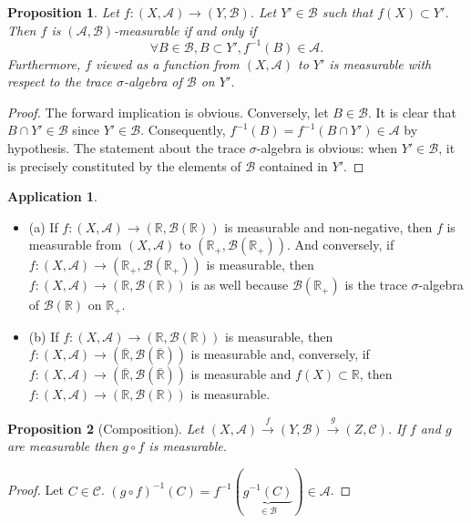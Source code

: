 \documentclass[12pt]{article}
\newtheorem{proposition}{Proposition}[section]
\theoremstyle{definition}
\newtheorem{application}{Application}[section]
\begin{document}
\begin{proposition}
Let $f : (X, \mathscr{A}) \to (Y, \mathscr{B})$. Let $Y' \in \mathscr{B}$ such that $f(X) \subset Y'$. Then $f$ is $(\mathscr{A}, \mathscr{B})$-measurable if and only if
$$ \forall B \in \mathscr{B}, B \subset Y', f^{-1}(B) \in \mathscr{A}. $$
Furthermore, $f$ viewed as a function from $(X, \mathscr{A})$ to $Y'$ is measurable with respect to the trace $\sigma$-algebra of $\mathscr{B}$ on $Y'$.
\end{proposition}
\begin{proof}
    The forward implication is obvious.
    Conversely, let $B \in \mathscr{B}$. It is clear that $B \cap Y' \in \mathscr{B}$ since $Y' \in \mathscr{B}$. Consequently, $f^{-1}(B) = f^{-1}(B \cap Y') \in \mathscr{A}$ by hypothesis. The statement about the trace $\sigma$-algebra is obvious: when $Y' \in \mathscr{B}$, it is precisely constituted by the elements of $\mathscr{B}$ contained in $Y'$. 
\end{proof}

\begin{application}
    \begin{itemize}
    \item (a) If $f : (X, \mathscr{A}) \to (\mathbb{R}, \mathscr{B}(\mathbb{R}))$ is measurable and non-negative, then $f$ is measurable from $(X, \mathscr{A})$ to $(\mathbb{R}_+, \mathscr{B}(\mathbb{R}_+))$. And conversely, if $f : (X, \mathscr{A}) \to (\mathbb{R}_+, \mathscr{B}(\mathbb{R}_+))$ is measurable, then $f : (X, \mathscr{A}) \to (\mathbb{R}, \mathscr{B}(\mathbb{R}))$ is as well because $\mathscr{B}(\mathbb{R}_+)$ is the trace $\sigma$-algebra of $\mathscr{B}(\mathbb{R})$ on $\mathbb{R}_+$.

\item (b) If $f : (X, \mathscr{A}) \to (\mathbb{R}, \mathscr{B}(\mathbb{R}))$ is measurable, then $f : (X, \mathscr{A}) \to (\overline{\mathbb{R}}, \mathscr{B}(\overline{\mathbb{R}}))$ is measurable and, conversely, if $f : (X, \mathscr{A}) \to (\overline{\mathbb{R}}, \mathscr{B}(\overline{\mathbb{R}}))$ is measurable and $f(X) \subset \mathbb{R}$, then $f : (X, \mathscr{A}) \to (\mathbb{R}, \mathscr{B}(\mathbb{R}))$ is measurable.
\end{itemize}
\end{application}

\begin{proposition}[Composition]
    Let $(X, \mathscr{A}) \xrightarrow{f} (Y, \mathscr{B}) \xrightarrow{g} (Z, \mathscr{C})$. If $f$ and $g$ are measurable then $g \circ f$ is measurable.
\end{proposition}
\begin{proof}
	Let $C \in \mathscr{C}$. $(g \circ f)^{-1}(C) = f^{-1}(\underbrace{g^{-1}(C)}_{\in \mathscr{B}}) \in \mathscr{A}$. 
\end{proof}
\end{document}
